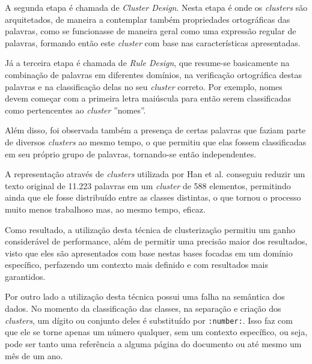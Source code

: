 A segunda etapa é chamada de \textit{Cluster Design}. Nesta etapa é onde os \textit{clusters} são arquitetados, de maneira a contemplar também propriedades ortográficas das palavras, como se funcionasse de maneira geral como uma expressão regular de palavras, formando então este \textit{cluster} com base nas características apresentadas.

\begin{textedited}
Já a terceira etapa é chamada de \textit{Rule Design}, que resume-se basicamente na  combinação de palavras em diferentes domínios, na verificação ortográfica destas palavras e na classificação delas no seu \textit{cluster} correto. Por exemplo, nomes devem começar com a primeira letra maiúscula para então serem classificadas como pertencentes ao \textit{cluster} ''nomes''.
\end{textedited}

\begin{textnew}
Além disso, foi observada também a presença de certas palavras que faziam parte de diversos \textit{clusters} ao mesmo tempo, o que permitiu que elas fossem classificadas em seu próprio grupo de palavras, tornando-se então independentes.
\end{textnew}

\begin{textnew}
A representação através de \textit{clusters} utilizada por Han et al. \cite{Han-Giles-WC} conseguiu reduzir um texto original de 11.223 palavras em um \textit{cluster} de 588 elementos, permitindo ainda que ele fosse distribuído entre as classes distintas, o que tornou o processo muito menos trabalhoso mas, ao mesmo tempo, eficaz.
\end{textnew}

\begin{textedited}
Como resultado, a utilização desta técnica de clusterização permitiu um ganho considerável de performance, além de permitir uma precisão maior dos resultados, visto que eles são apresentados com base nestas bases focadas em um domínio específico, perfazendo um contexto mais definido e com resultados mais garantidos.

Por outro lado a utilização desta técnica possui uma falha na semântica dos dados. No momento da classificação das classes, na separação e criação dos \textit{clusters}, um dígito ou conjunto deles é substituído por \texttt{:number:}. Isso faz com que ele se torne apenas um número qualquer, sem um contexto específico, ou seja, pode ser tanto uma referência a alguma página do documento ou até mesmo um mês de um ano.

\end{textedited}


